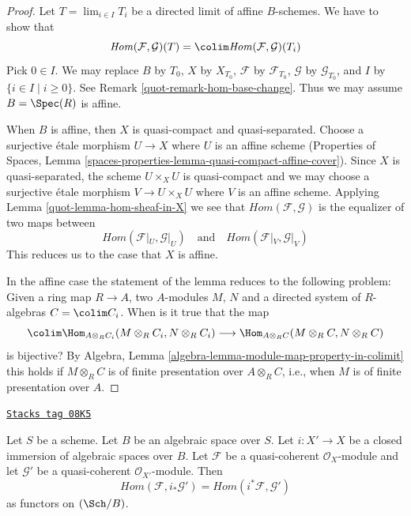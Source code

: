 \begin{proof}

Let $T = \lim_{i \in I} T_i$ be a directed limit of affine $B$-schemes.
We have to show that
$$
\mathit{Hom}(\mathcal{F}, \mathcal{G})(T) =
\colim \mathit{Hom}(\mathcal{F}, \mathcal{G})(T_i)
$$
Pick $0 \in I$. We may replace $B$ by $T_0$, $X$ by $X_{T_0}$,
$\mathcal{F}$ by $\mathcal{F}_{T_0}$, $\mathcal{G}$ by
$\mathcal{G}_{T_0}$, and $I$ by $\{i \in I \mid i \geq 0\}$.
See Remark \ref{quot-remark-hom-base-change}.
Thus we may assume $B = \Spec(R)$ is affine.

\medskip\noindent
When $B$ is affine, then $X$ is quasi-compact and quasi-separated.
Choose a surjective \'etale morphism $U \to X$ where $U$ is an
affine scheme (Properties of Spaces, Lemma
\ref{spaces-properties-lemma-quasi-compact-affine-cover}).
Since $X$ is quasi-separated, the scheme $U \times_X U$ is quasi-compact
and we may choose a surjective \'etale morphism $V \to U \times_X U$
where $V$ is an affine scheme. Applying Lemma \ref{quot-lemma-hom-sheaf-in-X}
we see that $\mathit{Hom}(\mathcal{F}, \mathcal{G})$ is the
equalizer of two maps between
$$
\mathit{Hom}(\mathcal{F}|_U, \mathcal{G}|_U)
\quad\text{and}\quad
\mathit{Hom}(\mathcal{F}|_V, \mathcal{G}|_V)
$$
This reduces us to the case that $X$ is affine.

\medskip\noindent
In the affine case the statement of the lemma reduces to
the following problem: Given a ring map $R \to A$, two $A$-modules
$M$, $N$ and a directed system of $R$-algebras $C = \colim C_i$.
When is it true that the map
$$
\colim \Hom_{A \otimes_R C_i}(M \otimes_R C_i, N \otimes_R C_i)
\longrightarrow
\Hom_{A \otimes_R C}(M \otimes_R C, N \otimes_R C)
$$
is bijective? By
Algebra, Lemma \ref{algebra-lemma-module-map-property-in-colimit}
this holds if $M \otimes_R C$ is of finite presentation over
$A \otimes_R C$, i.e., when $M$ is of finite presentation over $A$.
\end{proof}

\begin{lemma}
\label{quot-lemma-hom-closed}
\href{https://stacks.math.columbia.edu/tag/08K5}{\texttt{Stacks tag 08K5}}

Let $S$ be a scheme. Let $B$ be an algebraic space over $S$.
Let $i : X' \to X$ be a closed immersion of algebraic spaces
over $B$. Let $\mathcal{F}$ be a quasi-coherent $\mathcal{O}_X$-module
and let $\mathcal{G}'$ be a quasi-coherent $\mathcal{O}_{X'}$-module.
Then
$$
\mathit{Hom}(\mathcal{F}, i_*\mathcal{G}') =
\mathit{Hom}(i^*\mathcal{F}, \mathcal{G}')
$$
as functors on $(\Sch/B)$.
\end{lemma}

